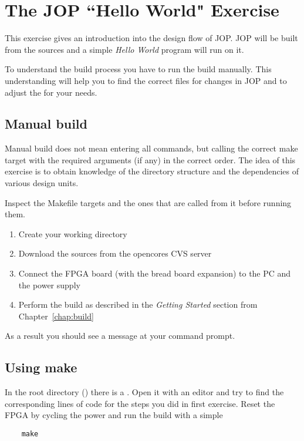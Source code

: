 \section{The JOP ``Hello World" Exercise}

This exercise gives an introduction into the design flow of JOP. JOP
will be built from the sources and a simple \emph{Hello World}
program will run on it.

To understand the build process you have to run the build manually.
This understanding will help you to find the correct files for
changes in JOP and to adjust the  for your needs.

\subsection{Manual build}

Manual build does not mean entering all commands, but calling the
correct make target with the required arguments (if any) in the
correct order. The idea of this exercise is to obtain knowledge of
the directory structure and the dependencies of various design units.

Inspect the Makefile targets and the ones that are called from it
before running them.

\begin{enumerate}
    \item Create your working directory
    \item Download the sources from the opencores CVS server
    \item Connect the FPGA board (with the bread board expansion) to the PC and the power supply
    \item Perform the build as described in the \emph{Getting Started} section
    from Chapter~\ref{chap:build}
\end{enumerate}

As a result you should see a message at your command prompt.

\subsection{Using make}

In the root directory () there is a . Open
it with an editor and try to find the corresponding lines of code for
the steps you did in first exercise. Reset the FPGA by cycling the
power and run the build with a simple
\begin{verbatim}
    make
\end{verbatim}

